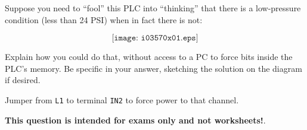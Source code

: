 

Suppose you need to ``fool'' this PLC into ``thinking'' that there is a low-pressure condition (less than 24 PSI) when in fact there is not:

$$\texttt{[image: i03570x01.eps]}$$

Explain how you could do that, without access to a PC to force bits inside the PLC's memory.  Be specific in your answer, sketching the solution on the diagram if desired.







Jumper from {\tt L1} to terminal {\tt IN2} to force power to that channel.







{\bf This question is intended for exams only and not worksheets!}.


